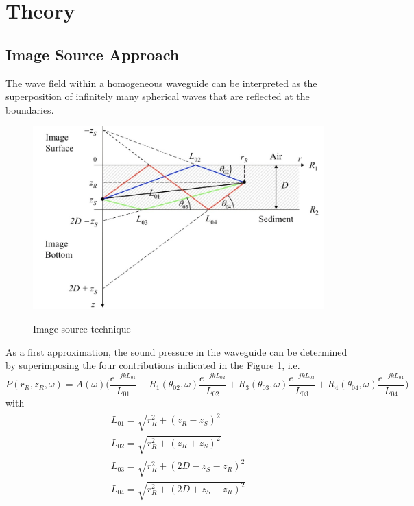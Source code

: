 \chapter*{Theory} 

\section{ Image Source Approach } \label{ Image Source Approach }
\noindent The wave field within a homogeneous waveguide can be interpreted as the superposition of infinitely many spherical waves that are reflected at the boundaries.
\begin{figure}[H]
\centering
{\includegraphics[scale=0.35]{usp1.jpg}}
\caption{ Image source technique }
\end{figure}
\noindent  As a first approximation, the sound pressure in the waveguide can be determined by superimposing the four contributions indicated in the Figure 1, i.e.
\begin{equation}
\textit{$P(r_R, z_R,\omega)$} = A(\omega) \Bigg( \frac{e^{-jkL_{01}}}{L_{01}} + R_{1}(\theta_{02},\omega) \frac{e^{-jkL_{02}}}{L_{02}} +  R_{3}(\theta_{03},\omega) \frac{e^{-jkL_{03}}}{L_{03}} +  R_{4}(\theta_{04},\omega) \frac{e^{-jkL_{04}}}{L_{04}}  \Bigg)
\end{equation}
\noindent with
\begin{equation}
\begin{gathered} 
L_{01}  = \sqrt{r_{R}^{2} + ( z_{R} - z_{S})^{2}} \\
L_{02}  = \sqrt{r_{R}^{2} + ( z_{R} + z_{S})^{2}} \\
L_{03}  = \sqrt{r_{R}^{2} + (2D - z_{S} - z_{R})^{2}} \\
L_{04}  = \sqrt{r_{R}^{2} + (2D + z_{S} - z_{R})^{2}}
\end{gathered} 
\end{equation}
